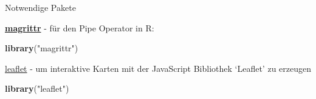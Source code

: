 \documentclass[ignorenonframetext,]{beamer}
\newenvironment{Shaded}{\begin{snugshade}}{\end{snugshade}}
\newcommand{\KeywordTok}[1]{\textcolor[rgb]{0.26,0.66,0.93}{\textbf{#1}}}
\newcommand{\NormalTok}[1]{\textcolor[rgb]{0.74,0.68,0.62}{#1}}
\newcommand{\StringTok}[1]{\textcolor[rgb]{0.02,0.61,0.04}{#1}}
\begin{document}
\begin{frame}[fragile]{Notwendige Pakete}
\protect\hypertarget{notwendige-pakete}{}

\begin{block}{\href{https://cran.r-project.org/web/packages/magrittr/index.html}{\textbf{magrittr}}
- für den Pipe Operator in R:}

\begin{Shaded}
\begin{Highlighting}[]
\KeywordTok{library}\NormalTok{(}\StringTok{"magrittr"}\NormalTok{)}
\end{Highlighting}
\end{Shaded}

\href{https://rstudio.github.io/leaflet/}{leaflet} - um interaktive
Karten mit der JavaScript Bibliothek `Leaflet' zu erzeugen

\begin{Shaded}
\begin{Highlighting}[]
\KeywordTok{library}\NormalTok{(}\StringTok{"leaflet"}\NormalTok{)}
\end{Highlighting}
\end{Shaded}

\end{block}

\end{frame}
\end{document}

